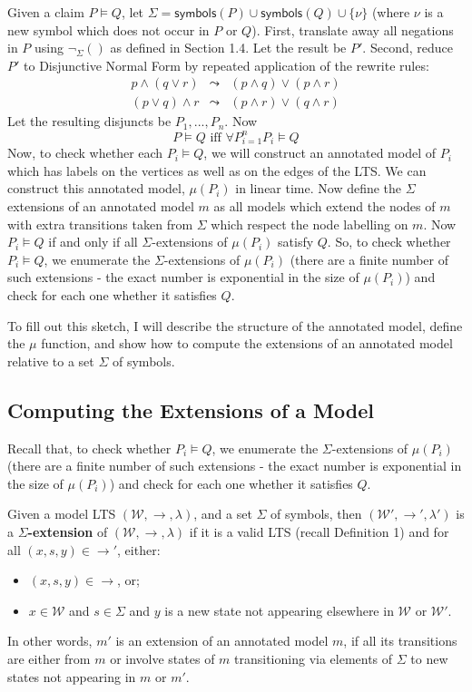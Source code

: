 Given a claim $P \models Q$, let $\Sigma = \mathsf{symbols}(P) \cup \mathsf{symbols}(Q) \cup \{\nu\}$ (where $\nu$ is a new symbol which does not occur in $P$ or $Q$).
First, translate away all negations in $P$ using $\neg_\Sigma()$ as defined in Section 1.4.
Let the result be $P'$.
Second, reduce $P'$ to Disjunctive Normal Form by repeated application of the rewrite rules:
\begin{eqnarray}
p \land (q \lor r) & \leadsto & (p \land q) \lor (p \land r) \nonumber \\
(p \lor q) \land r & \leadsto & (p \land r) \lor (q \land r) \nonumber
\end{eqnarray}
Let the resulting disjuncts be $P_1, ..., P_n$. 
Now 
\[
P \models Q \mbox{ iff } \forall P_{i=1}^n P_i \models Q
\]
Now, to check whether each $P_i \models Q$, we will construct an annotated model of $P_i$ which has labels on the vertices as well as on the edges of the LTS. We can construct this annotated model, $\mu(P_i)$ in linear time. 
Now define the $\Sigma$ extensions of an annotated model $m$ as all models which extend the nodes of $m$ with extra transitions taken from $\Sigma$ which respect the node labelling on $m$.
Now $P_i \models Q$ if and only if all $\Sigma$-extensions of $\mu(P_i)$ satisfy $Q$.
So, to check whether $P_i \models Q$, we enumerate the $\Sigma$-extensions of $\mu(P_i)$ (there are a finite number of such extensions - the exact number is exponential in the size of $\mu(P_i)$) and check for each one whether it satisfies $Q$.

To fill out this sketch, I will describe the structure of the annotated model, define the $\mu$ function, and show how to compute the extensions of an annotated model relative to a set $\Sigma$ of symbols.


\subsection{Computing the Extensions of a Model}

Recall that, to check whether $P_i \models Q$, we enumerate the $\Sigma$-extensions of $\mu(P_i)$ (there are a finite number of such extensions - the exact number is exponential in the size of $\mu(P_i)$) and check for each one whether it satisfies $Q$.

\begin{definition}
Given a model LTS $(\mathcal{W},\rightarrow,\lambda)$,  and a set $\Sigma$ of symbols, then $(\mathcal{W'},\rightarrow',\lambda')$ is a {\bf $\Sigma$-extension} of $(\mathcal{W},\rightarrow,\lambda)$ if it is a valid LTS (recall Definition 1) and for all $(x,s,y) \in \rightarrow'$, either:
\begin{itemize} 
\item
$(x, s, y) \in \rightarrow$,  or;
\item
 $x \in \mathcal{W}$ and $s \in \Sigma$ and $y$ is a new state not appearing elsewhere in $\mathcal{W}$ or $\mathcal{W'}$.
\end{itemize}
\end{definition}
In other words, $m'$ is an extension of an annotated model $m$, if all its transitions are either from $m$ or involve states of $m$ transitioning via elements of $\Sigma$ to new states not appearing in $m$ or $m'$.

